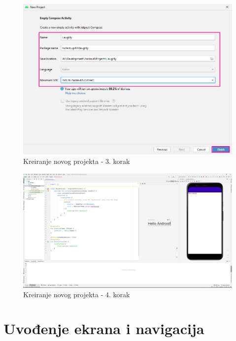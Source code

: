 \documentclass[11pt,a4paper,twoside]{article}
\begin{document}
\begin{figure}[!h]
	\centering
	\includegraphics[width=\textwidth]{new_project_03.png}
	\caption{Kreiranje novog projekta - 3. korak}
	\label{fig:new_project_03}	
\end{figure}

\begin{figure}[!h]
	\centering
	\includegraphics[width=\textwidth]{new_project_04.png}
	\caption{Kreiranje novog projekta - 4. korak}
	\label{fig:new_project_04}	
\end{figure}

\section{Uvođenje ekrana i navigacija}
\end{document}
